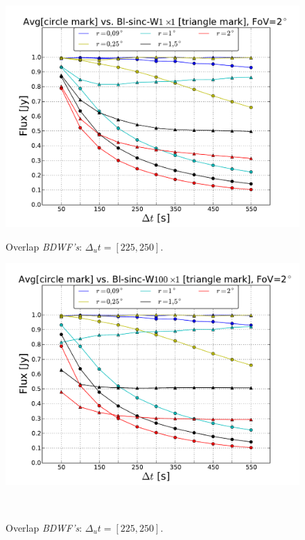 \documentclass[useAMS,usenatbib]{mn2e}
\begin{document}
\begin{figure}
  \centering
\begin{minipage}{0.45\linewidth}\includegraphics[width=1.\textwidth]{./Figures/max-integ-time-sinc-w1x1fov2.pdf}\caption{
Overlap 
		\textit{BDWF's}: $\Delta_u t= [225, 250]$.}\label{ fig:fig_3a}\end{minipage}
\begin{minipage}{0.45\linewidth}\includegraphics[width=1.\textwidth]{./Figures/max-integ-time-sinc-w100x1fov2.pdf}\caption{Overlap 
		\textit{BDWF's}: $\Delta_u t= [225, 250]$.}\label{ fig:fig_3a}\end{minipage}\\

\end{figure}
\end{document}
